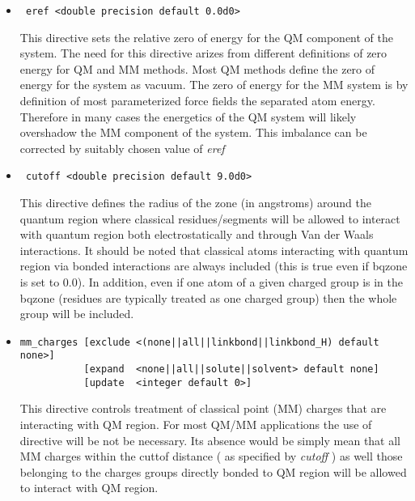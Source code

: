 \begin{itemize}

\item
\begin{verbatim}
 eref <double precision default 0.0d0>
\end{verbatim}

This directive sets the relative zero of energy for the
QM component of the system. The need for this directive
arizes from different definitions of zero energy for QM and MM methods.
Most QM methods define the zero of energy for the system as
vacuum. The zero of energy for the MM system is by
definition of most parameterized force fields the separated atom
energy. Therefore in many cases the energetics of the QM system 
will likely overshadow the
MM component of the system. This imbalance can be corrected by
suitably chosen value of {\it eref}

\item
\begin{verbatim}
 cutoff <double precision default 9.0d0>
\end{verbatim}

This directive defines the radius of the zone (in angstroms) around the quantum region
where classical residues/segments
will be allowed to interact with quantum region both electrostatically and through
Van der Waals interactions. It should be noted
that classical atoms interacting with quantum region via bonded interactions are always
included (this is true even if bqzone is set to $0.0$). In addition, even if one atom
of a given charged group is in the bqzone (residues are typically treated as one charged group) then the whole
group will be included.


\item
\begin{verbatim}
mm_charges [exclude <(none||all||linkbond||linkbond_H) default none>]
           [expand  <none||all||solute||solvent> default none]
           [update  <integer default 0>] 
\end{verbatim}

This directive controls treatment of classical point (MM) charges that are interacting
with QM region. For most QM/MM applications the use of directive will be not be necessary. Its
absence would be simply mean that all MM charges within the cuttof distance ( as specified by {\it cutoff} ) as
well those belonging to the charges groups directly bonded to QM region will be allowed to interact with QM region.


\end{itemize}
